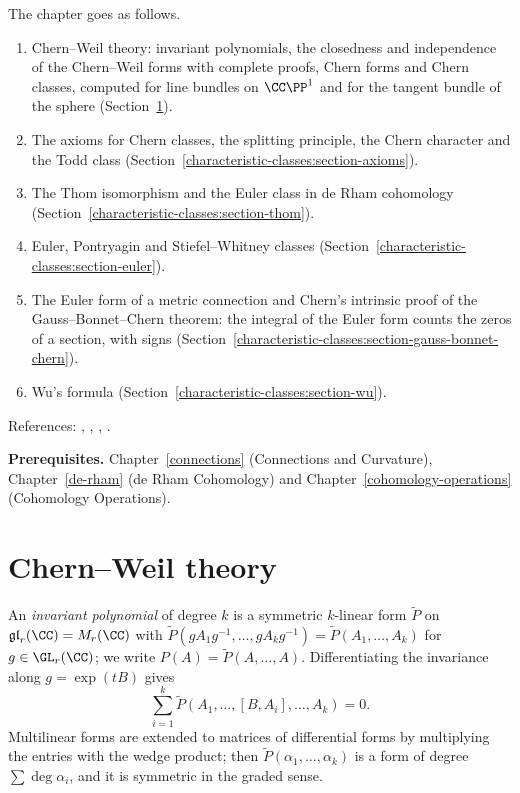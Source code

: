 The chapter goes as follows.
\begin{enumerate}
\item Chern--Weil theory: invariant polynomials, the closedness and independence of the Chern--Weil forms with complete proofs, Chern forms and Chern classes, computed
for line bundles on $\CC\PP^1$ and for the tangent bundle of the sphere (Section~\ref{characteristic-classes:section-chern-weil}).
\item The axioms for Chern classes, the splitting principle, the Chern character and the Todd class (Section~\ref{characteristic-classes:section-axioms}).
\item The Thom isomorphism and the Euler class in de Rham cohomology (Section~\ref{characteristic-classes:section-thom}).
\item Euler, Pontryagin and Stiefel--Whitney classes (Section~\ref{characteristic-classes:section-euler}).
\item The Euler form of a metric connection and Chern's intrinsic proof of the Gauss--Bonnet--Chern theorem: the integral of the Euler form counts the zeros of a section, with
signs (Section~\ref{characteristic-classes:section-gauss-bonnet-chern}).
\item Wu's formula (Section~\ref{characteristic-classes:section-wu}).
\end{enumerate}
References: \cite{milnor-stasheff}, \cite{bott-tu}, \cite{hirzebruch-topological}, \cite[Chapter 1]{griffiths-harris}.

\noindent\textbf{Prerequisites.} Chapter~\ref{connections} (Connections and Curvature), Chapter~\ref{de-rham} (de Rham Cohomology)
and Chapter~\ref{cohomology-operations} (Cohomology Operations).

\section{Chern--Weil theory}\label{characteristic-classes:section-chern-weil}

\begin{definition}\label{characteristic-classes:definition-invariant-polynomial}
An \emph{invariant polynomial} of degree $k$ is a symmetric $k$-linear form $\tilde{P}$ on $\mathfrak{gl}_r(\CC) = M_r(\CC)$ with
$\tilde{P}(gA_1g^{-1}, \ldots, gA_kg^{-1}) = \tilde{P}(A_1, \ldots, A_k)$ for $g \in \GL_r(\CC)$; we write $P(A) = \tilde{P}(A, \ldots, A)$. Differentiating the invariance along $g = \exp(tB)$ gives
\[
\sum_{i=1}^k\tilde{P}(A_1, \ldots, [B, A_i], \ldots, A_k) = 0 .
\]
Multilinear forms are extended to matrices of differential forms by multiplying the entries with the wedge product; then $\tilde{P}(\alpha_1, \ldots, \alpha_k)$ is a form of degree $\sum\deg\alpha_i$, and it is
symmetric in the graded sense.
\end{definition}

